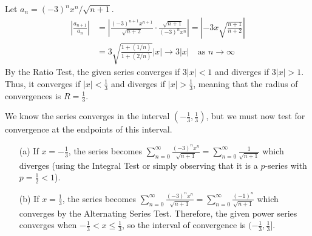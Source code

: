   \begin{solution}
    Let $a_n = (-3)^n x^n / \sqrt{n+1}$.
    \begin{align*}
      \left|\frac{a_{n+1}}{a_n}\right| &= \left| \frac{(-3)^{n+1} x^{n+1}}{\sqrt{n+2}} \cdot \frac{\sqrt{n+1}}{(-3)^n x^n} \right| = \left| -3x \sqrt{\frac{n+1}{n+2}} \right| \\
      &= 3\sqrt{\frac{1 + (1/n)}{1 + (2/n)}} |x| \to 3|x| \quad\text{as } n\to\infty
    \end{align*}
    By the Ratio Test, the given series converges if $3|x|<1$ and diverges if $3|x|>1$. Thus, it converges if $|x|< \frac{1}{3}$ and diverges if  $|x|> \frac{1}{3}$, meaning that the radius of convergences is $R = \frac{1}{3}$.\par
    We know the series converges in the interval $(-\frac{1}{3},\frac{1}{3})$, but we must now test for convergence at the endpoints of this interval.
    \begin{enumerate}
      \item[(a)] If $x=-\frac{1}{3}$, the series becomes
      $\displaystyle\sum_{n=0}^{\infty} \frac{(-3)^n x^n}{\sqrt{n+1}} = \sum_{n=0}^{\infty} \frac{1}{\sqrt{n+1}} $
      which diverges (using the Integral Test or simply observing that it is a $p$-series with $p=\frac{1}{2}<1$).
      \item[(b)] If $x = \frac{1}{3}$, the series becomes
      $\displaystyle\sum_{n=0}^{\infty} \frac{(-3)^n x^n}{\sqrt{n+1}} = \sum_{n=0}^{\infty} \frac{(-1)^n}{\sqrt{n+1}} $ which converges by the Alternating Series Test. Therefore, the given power series converges when $-\frac{1}{3} < x \leq \frac{1}{3}$, so the interval of convergence is $(-\frac{1}{3},\frac{1}{3}]$.
    \end{enumerate}
  \end{solution}
